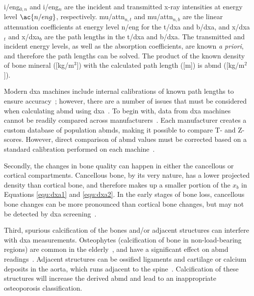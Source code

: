 
\ac{i/eng}$_{0,n}$ and \ac{i/eng}$_n$ are the incident and transmitted x-ray intensities at energy level $\ac{n/eng}$, respectively.
\ac{mu/attn}$_{n,t}$ and \ac{mu/attn}$_{n,b}$ are the linear attenuation coefficients at energy level \ac{n/eng} for the \acf{t/dxa} and \acf{b/dxa}, and \ac{x/dxa}$_t$ and \ac{x/dxa}$_b$ are the path lengths in the \acl{t/dxa} and \acl{b/dxa}.
The transmitted and incident energy levels, as well as the absorption coefficients, are known \textit{a priori}, and therefore the path lengths can be solved.
The product of the known density of bone mineral ([\ac{kg}/\ac{m}$^3$]) with the calculated path length ([\ac{m}]) is \ac{abmd} ([\ac{kg}/\ac{m}$^2$]).

Modern \ac{dxa} machines include internal calibrations of known path lengths to ensure accuracy~\citep{guillemot_pelvic_1997}; however, there are a number of issues that must be considered when calculating \ac{abmd} using \ac{dxa}~\citep{bolotin_patient-specific_2003}.
To begin with, data from \ac{dxa} machines cannot be readily compared across manufacturers~\citep{genant_universal_1994}.
Each manufacturer creates a custom database of population \acp{abmd}, making it possible to compare T- and Z-scores. However, direct comparison of \ac{abmd} values must be corrected based on a standard calibration performed on each machine~\citep{genant_universal_1994}.

Secondly, the changes in bone quality can happen in either the cancellous or cortical compartments.
Cancellous bone, by its very nature, has a lower projected density than cortical bone, and therefore makes up a smaller portion of the $x_b$ in Equations \ref{equ:dxa1} and \ref{equ:dxa2}.
In the early stages of bone loss, cancellous bone changes can be more pronounced than cortical bone changes, but may not be detected by \ac{dxa} screening~\citep{guglielmi_osteoporosis:_1994}.

Third, spurious calcification of the bones and/or adjacent structures can interfere with \ac{dxa} measurements.
Osteophytes (calcification of bone in non-load-bearing regions) are common in the elderly~\citep{rand_impact_1997}, and have a significant effect on \ac{abmd} readings~\citep{rand_impact_1997}.
Adjacent structures can be ossified ligaments and cartilage or calcium deposits in the aorta, which runs adjacent to the spine~\citep{smith_aortic_1999}.
Calcification of these structures will increase the derived \ac{abmd} and lead to an inappropriate osteoporosis classification.

